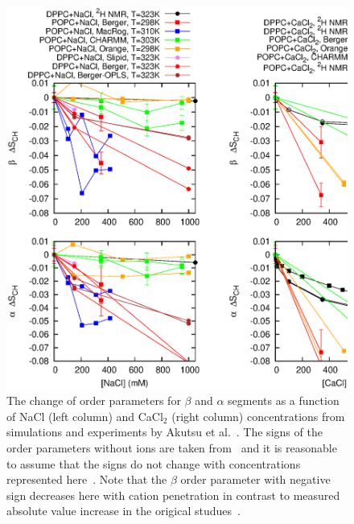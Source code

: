 \documentclass[pre,aps,floatfix,authordate1-4,twocolumn]{revtex4-1}
\begin{document}
\begin{figure}[]
  \centering
  \includegraphics[width=15cm]{../Fig/OrderParameterIONSchanges.eps}
  \caption{\label{ordPions}
    The change of order parameters for $\beta$ and $\alpha$ segments as a function of NaCl (left column) and CaCl$_2$ (right column) concentrations from simulations 
    and experiments by Akutsu et al.~\cite{akutsu81}. The signs of the order parameters without ions are taken from~\cite{hong95a,hong95b,gross97} and it is reasonable
    to assume that the signs do not change with concentrations represented here~\cite{altenbach84}. Note that the $\beta$ order parameter with negative sign decreases here with cation
    penetration in contrast to measured absolute value increase in the origical studues~\cite{akutsu81,altenbach84}.
}
\end{figure}
\end{document}
